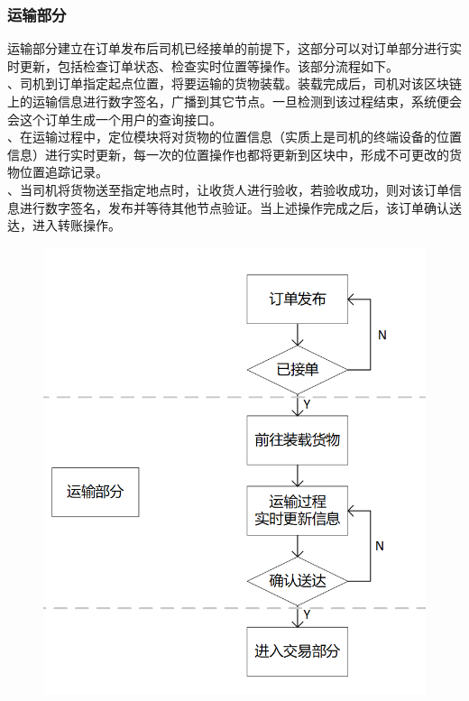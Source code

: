 \documentclass[UTF8]{ctexart}
\begin{document}
\begin{multicols}{2}
  \subsubsection{运输部分}
  运输部分建立在订单发布后司机已经接单的前提下，这部分可以对订单部分进行实时更新，包括检查订单状态、检查实时位置等操作。该部分流程如下。\\
  、司机到订单指定起点位置，将要运输的货物装载。装载完成后，司机对该区块链上的运输信息进行数字签名，广播到其它节点。一旦检测到该过程结束，系统便会会这个订单生成一个用户的查询接口。\\
  、在运输过程中，定位模块将对货物的位置信息（实质上是司机的终端设备的位置信息）进行实时更新，每一次的位置操作也都将更新到区块中，形成不可更改的货物位置追踪记录。\\
  、当司机将货物送至指定地点时，让收货人进行验收，若验收成功，则对该订单信息进行数字签名，发布并等待其他节点验证。当上述操作完成之后，该订单确认送达，进入转账操作。
  \begin{figure}[H]
    \centering
    \includegraphics[scale=0.6]{image/transfer.png}
    \caption{\heiti{}\songti}
  \end{figure}

\end{multicols}
\end{document}
